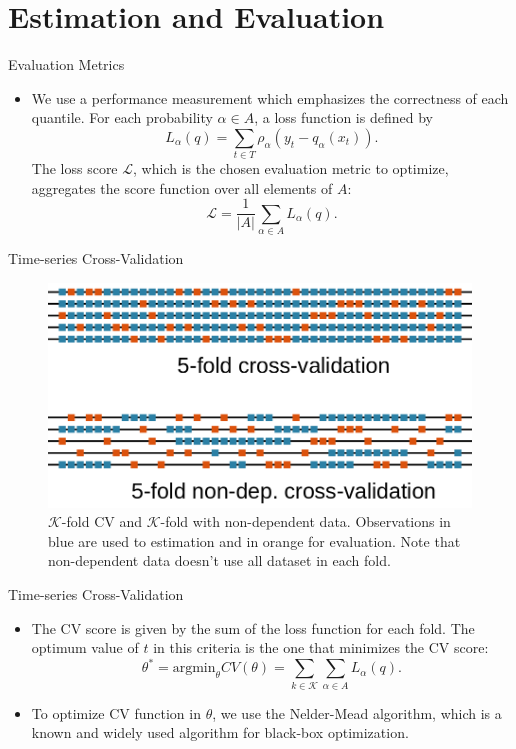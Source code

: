 \documentclass[11pt]{beamer}
\begin{document}
\section{Estimation and Evaluation}\label{estimation-and-evaluation}

\begin{frame}{Evaluation Metrics}

\begin{itemize}

\item
We use a performance measurement which emphasizes the correctness of
each quantile. For each probability \(\alpha \in A\), a loss function
is defined by
\[L_\alpha(q)= \sum_{t\in T}\rho_{\alpha}(y_{t}-q_{\alpha}(x_t)).\]
The loss score \(\mathcal{L}\), which is the chosen evaluation metric
to optimize, aggregates the score function over all elements of \(A\):
\[\mathcal{L}= \frac{1}{|A|}\sum_{\alpha \in A}L_\alpha(q).\]
\end{itemize}

\end{frame}

\begin{frame}{Time-series Cross-Validation}

\begin{figure}
\centering
\includegraphics[width=0.9\linewidth]{Images/Cross-validation-scheme}
\caption{$\mathcal{K}$-fold CV and $\mathcal{K}$-fold with non-dependent data. Observations in blue are used to estimation and in orange for evaluation. Note that non-dependent data doesn't use all dataset in each fold.}
\label{fig:cross-validation-scheme}
\end{figure}

\end{frame}

\begin{frame}{Time-series Cross-Validation}

\begin{itemize}

\item
The CV score is given by the sum of the loss function for each fold.
The optimum value of \(t\) in this criteria is the one that minimizes
the CV score: \[
\theta^* = \text{argmin}_\theta CV(\theta) = \sum_{k \in \mathcal{K}} \sum_{\alpha \in A} L_\alpha(q).
\]
\item
To optimize CV function in \(\theta\), we use the Nelder-Mead
algorithm, which is a known and widely used algorithm for black-box
optimization.
\end{itemize}

\end{frame}
\end{document}
